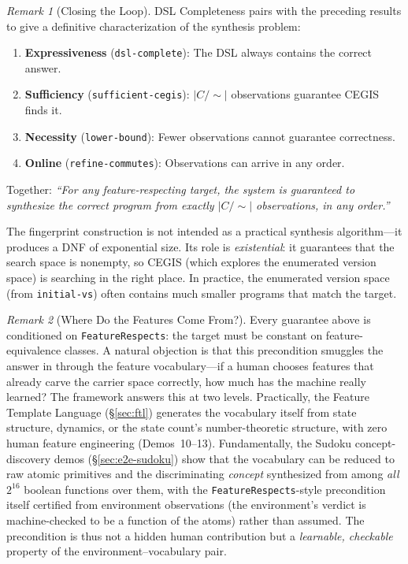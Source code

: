 \documentclass[9pt,a4paper]{article}
\theoremstyle{plain}
\theoremstyle{definition}
\theoremstyle{remark}
\newtheorem{remark}{Remark}
\begin{document}
\begin{remark}[Closing the Loop]
DSL Completeness pairs with the preceding results to give a definitive characterization of the synthesis problem:
\begin{enumerate}
\item \textbf{Expressiveness} (\texttt{dsl-complete}): The DSL always contains the correct answer.
\item \textbf{Sufficiency} (\texttt{sufficient-cegis}): $|C/{\sim}|$ observations guarantee CEGIS finds it.
\item \textbf{Necessity} (\texttt{lower-bound}): Fewer observations cannot guarantee correctness.
\item \textbf{Online} (\texttt{refine-commutes}): Observations can arrive in any order.
\end{enumerate}
Together: \emph{``For any feature-respecting target, the system is guaranteed to synthesize the correct program from exactly $|C/{\sim}|$ observations, in any order.''}

The fingerprint construction is not intended as a practical synthesis algorithm---it produces a DNF of exponential size.
Its role is \emph{existential}: it guarantees that the search space is nonempty, so CEGIS (which explores the enumerated version space) is searching in the right place.
In practice, the enumerated version space (from \texttt{initial-vs}) often contains much smaller programs that match the target.
\end{remark}

\begin{remark}[Where Do the Features Come From?]
Every guarantee above is conditioned on \texttt{FeatureRespects}: the target must be constant on feature-equivalence classes.  A natural objection is that this precondition smuggles the answer in through the feature vocabulary---if a human chooses features that already carve the carrier space correctly, how much has the machine really learned?  The framework answers this at two levels.  Practically, the Feature Template Language (\S\ref{sec:ftl}) generates the vocabulary itself from state structure, dynamics, or the state count's number-theoretic structure, with zero human feature engineering (Demos~10--13).  Fundamentally, the Sudoku concept-discovery demos (\S\ref{sec:e2e-sudoku}) show that the vocabulary can be reduced to raw atomic primitives and the discriminating \emph{concept} synthesized from among \emph{all} $2^{16}$ boolean functions over them, with the \texttt{FeatureRespects}-style precondition itself certified from environment observations (the environment's verdict is machine-checked to be a function of the atoms) rather than assumed.  The precondition is thus not a hidden human contribution but a \emph{learnable, checkable} property of the environment--vocabulary pair.
\end{remark}
\end{document}
